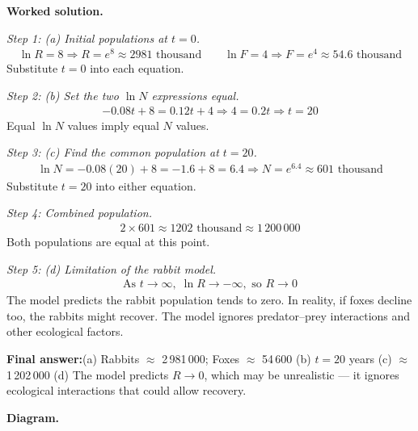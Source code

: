 \documentclass[11pt]{article}
\begin{document}
\textbf{Worked solution.}

\textit{Step 1: (a) Initial populations at \( t = 0 \).}
\[\begin{gathered}
\ln R = 8 \Rightarrow R = e^8 \approx 2981 \text{ thousand} \qquad \ln F = 4 \Rightarrow F = e^4 \approx 54.6 \text{ thousand}
\end{gathered}\]
Substitute \( t = 0 \) into each equation.

\textit{Step 2: (b) Set the two \( \ln N \) expressions equal.}
\[\begin{gathered}
-0.08t + 8 = 0.12t + 4 \Rightarrow 4 = 0.2t \Rightarrow t = 20
\end{gathered}\]
Equal \( \ln N \) values imply equal \( N \) values.

\textit{Step 3: (c) Find the common population at \( t = 20 \).}
\[\begin{gathered}
\ln N = -0.08(20) + 8 = -1.6 + 8 = 6.4 \Rightarrow N = e^{6.4} \approx 601 \text{ thousand}
\end{gathered}\]
Substitute \( t = 20 \) into either equation.

\textit{Step 4: Combined population.}
\[\begin{gathered}
2 \times 601 \approx 1202 \text{ thousand} \approx 1\,200\,000
\end{gathered}\]
Both populations are equal at this point.

\textit{Step 5: (d) Limitation of the rabbit model.}
\[\begin{gathered}
\text{As } t \to \infty, \; \ln R \to -\infty, \text{ so } R \to 0
\end{gathered}\]
The model predicts the rabbit population tends to zero. In reality, if foxes decline too, the rabbits might recover. The model ignores predator--prey interactions and other ecological factors.

\begin{answerbox}
\textbf{Final answer:}\quad (a) Rabbits $\approx$ 2\,981\,000; Foxes $\approx$ 54\,600 \quad  (b) \(\displaystyle  t = 20 \) years \quad  (c) $\approx$ 1\,202\,000 \quad  (d) The model predicts \(\displaystyle  R \to 0 \), which may be unrealistic --- it ignores ecological interactions that could allow recovery.
\end{answerbox}
\textbf{Diagram.}
\end{document}
